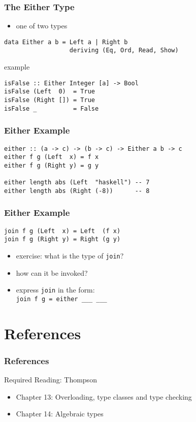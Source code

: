 \documentclass[dvipsnames]{beamer}
\theoremstyle{plain}
\begin{document}
\begin{frame}[fragile]
  \frametitle{The Either Type}

  \begin{itemize}
    \item one of two types
  \end{itemize}

  \begin{lstlisting}
data Either a b = Left a | Right b
                  deriving (Eq, Ord, Read, Show)
  \end{lstlisting}

  \begin{exampleblock}{example}
    \begin{lstlisting}
isFalse :: Either Integer [a] -> Bool
isFalse (Left  0)  = True
isFalse (Right []) = True
isFalse _          = False
    \end{lstlisting}
  \end{exampleblock}
\end{frame}

\begin{frame}[fragile]
  \frametitle{Either Example}

  \begin{lstlisting}
either :: (a -> c) -> (b -> c) -> Either a b -> c
either f g (Left  x) = f x
either f g (Right y) = g y

either length abs (Left  "haskell") -- 7
either length abs (Right (-8))      -- 8
  \end{lstlisting}
\end{frame}

\begin{frame}[fragile]
  \frametitle{Either Example}

  \begin{lstlisting}
join f g (Left  x) = Left  (f x)
join f g (Right y) = Right (g y)
  \end{lstlisting}

  \medskip
  \begin{itemize}
    \item exercise: what is the type of \lstinline|join|?
    \item how can it be invoked?
    \item express \lstinline|join| in the form:\\
      \lstinline|join f g = either ___ ___|
  \end{itemize}
\end{frame}

\section*{References}

\begin{frame}
  \frametitle{References}

  \begin{block}{Required Reading: Thompson}
    \begin{itemize}
      \item Chapter 13: \alert{Overloading, type classes and type checking}
      \item Chapter 14: \alert{Algebraic types}
    \end{itemize}
  \end{block}
\end{frame}
\end{document}
